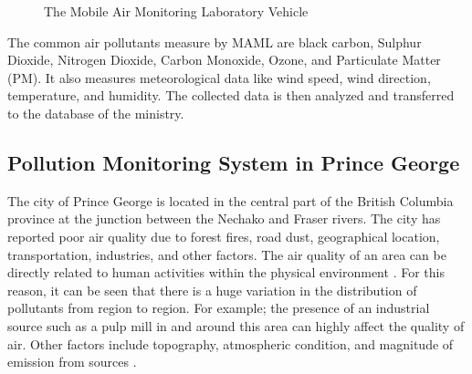 \begin{enumerate}
\begin{figure}[h]
    \caption{ The Mobile Air Monitoring Laboratory Vehicle  \cite{MAML}}
    
    
    \label{MAML}
   \end{figure}

   \vspace{5mm}



  



The common air pollutants measure by MAML are black carbon, Sulphur Dioxide, Nitrogen Dioxide, Carbon Monoxide, Ozone, and Particulate Matter (PM). 
It also measures meteorological data like wind speed, wind direction, temperature, and humidity.
The collected data is then analyzed and transferred to the database of the ministry.

\end{enumerate}



 \subsection{Pollution Monitoring System in Prince George}
 

 The city of Prince George is located in the central part of the British Columbia province at the junction between the Nechako and Fraser rivers. The city has reported poor air quality due to forest fires, road dust, geographical location, transportation, industries, and other factors.
The air quality of an area can be directly related to human activities within the physical environment \cite{manisalidis2020environmental}.
 For this reason, it can be seen that there is a huge variation in the distribution of pollutants from region to region. For example; the presence of an industrial source such as a pulp mill in and around this area can highly affect the quality of air. Other factors include topography, atmospheric condition, and magnitude of emission from sources \cite{Prevention2000}. 
 
